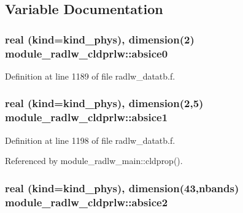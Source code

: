 \subsection{Variable Documentation}
\subsubsection[{\texorpdfstring{absice0}{absice0}}]{\setlength{\rightskip}{0pt plus 5cm}real (kind=kind\+\_\+phys), dimension(2) module\+\_\+radlw\+\_\+cldprlw\+::absice0}\hypertarget{namespacemodule__radlw__cldprlw_a6610d37cab9ccd4de89237c5de536cfb}{}\label{namespacemodule__radlw__cldprlw_a6610d37cab9ccd4de89237c5de536cfb}


Definition at line 1189 of file radlw\+\_\+datatb.\+f.

\subsubsection[{\texorpdfstring{absice1}{absice1}}]{\setlength{\rightskip}{0pt plus 5cm}real (kind=kind\+\_\+phys), dimension(2,5) module\+\_\+radlw\+\_\+cldprlw\+::absice1}\hypertarget{namespacemodule__radlw__cldprlw_a3b86ff9d6791d95170d3b3ab61cd8291}{}\label{namespacemodule__radlw__cldprlw_a3b86ff9d6791d95170d3b3ab61cd8291}


Definition at line 1198 of file radlw\+\_\+datatb.\+f.



Referenced by module\+\_\+radlw\+\_\+main\+::cldprop().

\subsubsection[{\texorpdfstring{absice2}{absice2}}]{\setlength{\rightskip}{0pt plus 5cm}real (kind=kind\+\_\+phys), dimension(43,nbands) module\+\_\+radlw\+\_\+cldprlw\+::absice2}\hypertarget{namespacemodule__radlw__cldprlw_ad2238686c0e6d1c5d74bcfdde1542e1d}{}\label{namespacemodule__radlw__cldprlw_ad2238686c0e6d1c5d74bcfdde1542e1d}


